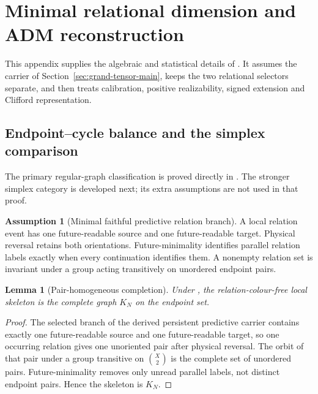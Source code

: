 \documentclass[11pt]{article}
\numberwithin{equation}{section}
\newtheorem{lemma}[lemma]{Lemma}
\theoremstyle{definition}
\newtheorem{assumption}[assumption]{Assumption}
\theoremstyle{remark}
\begin{document}
\section{Minimal relational dimension and ADM reconstruction}
\label{supp:dimension-adm}

This appendix supplies the algebraic and statistical details of
. It assumes the carrier of Section~\ref{sec:grand-tensor-main},
keeps the two relational selectors separate, and then treats calibration,
positive realizability, signed extension and Clifford representation.

\subsection{Endpoint--cycle balance and the simplex comparison}

The primary regular-graph classification is proved directly in
. The stronger simplex category is developed
next; its extra assumptions are not used in that proof.

\begin{assumption}[Minimal faithful predictive relation branch]
\label{ass:supp-relational-branch}
A local relation event has one future-readable source and one future-readable
target.  Physical reversal retains both orientations.  Future-minimality
identifies parallel relation labels exactly when every continuation identifies
them.  A nonempty relation set is invariant under a group acting transitively
on unordered endpoint pairs.
\end{assumption}

\begin{lemma}[Pair-homogeneous completion]
\label{lem:supp-pair-completion}
Under , the relation-colour-free local skeleton
is the complete graph $K_N$ on the endpoint set.
\end{lemma}

\begin{proof}
The selected branch of the derived persistent predictive carrier contains
exactly one future-readable source and one future-readable target, so one
occurring relation gives one unoriented pair after physical reversal.  The
orbit of that pair under a group transitive on $\binom{X}{2}$ is the complete
set of unordered pairs.  Future-minimality removes only unread parallel labels,
not distinct endpoint pairs.  Hence the skeleton is $K_N$.
\end{proof}
\end{document}
